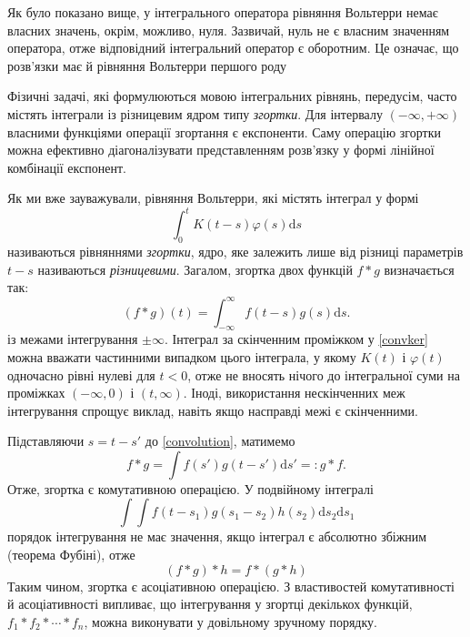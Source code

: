 \documentclass[14pt,twoside]{extreport}
\theoremstyle{mystyle}
\numberwithin{equation}{chapter}
\begin{document}
Як було показано вище, у інтегрального оператора рівняння Вольтерри немає власних значень, окрім, можливо, нуля. Зазвичай, нуль не є власним значенням оператора, отже відповідний інтегральний оператор є оборотним. Це означає, що розв'язки має й рівняння Вольтерри першого роду

Фізичні задачі, які формулюються мовою інтегральних рівнянь, передусім, часто містять інтеграли із різницевим ядром типу \emph{згортки}. Для інтервалу $(-\infty, +\infty)$ власними функціями операції згортання є експоненти. Саму операцію згортки можна ефективно діагоналізувати представленням розв'язку у формі лінійної комбінації експонент.

Як ми вже зауважували, рівняння Вольтерри, які містять інтеграл у формі
\begin{equation}\label{convker}
	\displaystyle \int_{0}^{t}K(t-s)\varphi(s)\mathrm{d}s
\end{equation}
називаються рівняннями \emph{згортки}, ядро, яке залежить лише від різниці параметрів $t-s$ називаються \emph{різницевими}. Загалом, згортка двох функцій $f*g$ визначається так:
\begin{equation}\label{convolution}
	(f*g)(t)=\displaystyle \int_{-\infty}^{\infty}f(t-s)g(s)\mathrm{d}s.
\end{equation}
із межами інтегрування $\pm\infty$. Інтеграл за скінченним проміжком у \eqref{convker} можна вважати частинними випадком цього інтеграла, у якому $K(t)$ і $\varphi(t)$ одночасно рівні нулеві для $t<0$, отже не вносять нічого до інтегральної суми на проміжках $(-\infty, 0)$ і $(t, \infty)$. Іноді, використання нескінченних меж інтегрування спрощує виклад, навіть якщо насправді межі є скінченними.

Підставляючи $s=t-s'$ до \eqref{convolution}, матимемо
\begin{equation}\label{convolution2}
	f*g=\displaystyle \int f(s')g(t-s')\mathrm{d}s'=:g*f.
\end{equation}
Отже, згортка є комутативною операцією. У подвійному інтегралі
\begin{equation*}
	\displaystyle \int\int f(t-s_{1})g(s_{1}-s_{2})h(s_{2})\mathrm{d}s_{2}\mathrm{d}s_{1}
\end{equation*}
порядок інтегрування не має значення, якщо інтеграл є абсолютно збіжним (теорема Фубіні), отже
\begin{equation*}
	(f*g)*h=f*(g*h)
\end{equation*}
Таким чином, згортка є асоціативною операцією. З властивостей комутативності й асоціативності випливає, що інтегрування у згортці декількох функцій, $f_{1}*f_{2}*\cdots*f_{n}$, можна виконувати у довільному зручному порядку.
\end{document}
